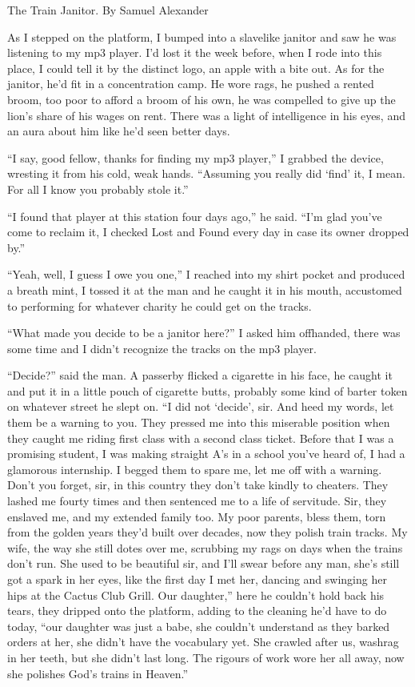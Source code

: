 \documentclass[oneside]{book}
\begin{document}
{
\large
The Train Janitor.  By Samuel Alexander
\par
}

\vspace{2mm}
As I stepped on the platform, I bumped into a slavelike janitor and saw he was listening to
my mp3 player.  I'd lost it the week before, when I rode into this place, I could tell it by the distinct
logo, an apple with a bite out.  As for the janitor, he'd fit in a concentration
camp.  He wore rags, he pushed a rented broom, too poor to afford a broom of his own, he was compelled to
give up the lion's share of his wages on rent.  There was a light of
intelligence in his eyes, and an aura about him like he'd seen better days.

``I say, good fellow, thanks for finding my mp3 player,'' I grabbed the device, wresting it
from his cold, weak hands.  ``Assuming you really did `find' it, I mean.
For all I know you probably stole it.''

``I found that player at this station four days ago,'' he said.  ``I'm glad you've come to reclaim it, I
checked Lost and Found every day in case its owner dropped by.''

``Yeah, well, I guess I owe you one,'' I reached into my shirt pocket and produced a breath mint, I tossed it
at the man and he caught it in his mouth, accustomed to performing for whatever charity he could get on the tracks.

``What made you decide to be a janitor here?'' I asked him offhanded, there was some time and I didn't
recognize the tracks on the mp3 player.

``Decide?'' said the man.  A passerby flicked a cigarette in his face, he caught it and put it in a little pouch
of cigarette butts, probably some kind of barter token on whatever street he slept on.  ``I
did not `decide', sir.  And heed my words, let them be a warning to you.  They pressed me into this miserable
position when they caught me riding first class with a second class ticket.  Before that I was a promising
student, I was making straight A's in a school you've heard of, I had a glamorous
internship.  I begged them to spare me, let me off with a warning.  Don't you forget, sir, in this country they
don't take kindly to cheaters.  They lashed me fourty times and then sentenced me to a life of servitude.
Sir, they enslaved me, and my extended family too.  My poor parents, bless them, torn from the golden years they'd
built over decades, now they polish train tracks.  My wife, the way she still dotes over me, scrubbing my rags on
days when the trains don't run.  She used to be beautiful sir, and I'll swear before any man, she's still got a
spark in her eyes, like the first day I met her, dancing and swinging her hips at the Cactus Club Grill.  Our
daughter,'' here he couldn't hold back his tears, they dripped onto the platform, adding to the cleaning he'd have
to do today, ``our daughter was just a babe, she couldn't understand as they barked orders at her, she
didn't have the vocabulary yet.  She crawled after us, washrag in her teeth, but she didn't
last long.  The rigours of work wore her all away, now she polishes God's trains in Heaven.''
\end{document}
